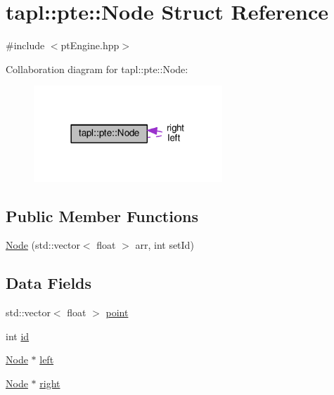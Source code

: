 \hypertarget{structtapl_1_1pte_1_1Node}{}\section{tapl\+:\+:pte\+:\+:Node Struct Reference}
\label{structtapl_1_1pte_1_1Node}


{\ttfamily \#include $<$pt\+Engine.\+hpp$>$}



Collaboration diagram for tapl\+:\+:pte\+:\+:Node\+:\nopagebreak
\begin{figure}[H]
\begin{center}
\leavevmode
\includegraphics[width=201pt]{structtapl_1_1pte_1_1Node__coll__graph}
\end{center}
\end{figure}
\subsection*{Public Member Functions}
\begin{DoxyCompactItemize}
\item 
\hyperlink{structtapl_1_1pte_1_1Node_afec8c3ce63e2269d7602de2f22dc11c6}{Node} (std\+::vector$<$ float $>$ arr, int set\+Id)
\end{DoxyCompactItemize}
\subsection*{Data Fields}
\begin{DoxyCompactItemize}
\item 
std\+::vector$<$ float $>$ \hyperlink{structtapl_1_1pte_1_1Node_a8b3448deee1ff9e0c9873b25ee83dd23}{point}
\item 
int \hyperlink{structtapl_1_1pte_1_1Node_a4141ba3367563df6be438c4344042b09}{id}
\item 
\hyperlink{structtapl_1_1pte_1_1Node}{Node} $\ast$ \hyperlink{structtapl_1_1pte_1_1Node_afaef86b1bf78932339871f61ad88535b}{left}
\item 
\hyperlink{structtapl_1_1pte_1_1Node}{Node} $\ast$ \hyperlink{structtapl_1_1pte_1_1Node_ab68a326fa1516aa082032dfd05065dd9}{right}
\end{DoxyCompactItemize}


